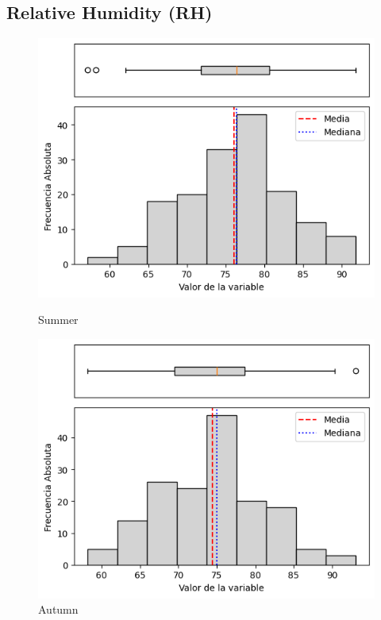 \subsection{Relative Humidity (RH)}

\begin{figure}[htbp]
\centering
\begin{minipage}{0.30\textwidth}
  \includegraphics[width=\linewidth]{resultados/por_estacion_del_anio/boxplot_clases_por_estacion/Ancachuro/RH_HistBoxplot_Summer.png}
  \caption*{Summer}
\end{minipage}
\hfill
\begin{minipage}{0.30\textwidth}
  \includegraphics[width=\linewidth]{resultados/por_estacion_del_anio/boxplot_clases_por_estacion/Ancachuro/RH_HistBoxplot_Autumn.png}
  \caption*{Autumn}
\end{minipage}


\end{figure}
